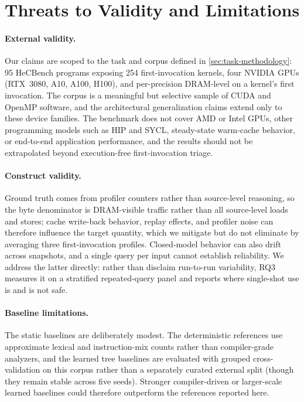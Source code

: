 \section{Threats to Validity and Limitations}
\label{sec:threats}

\paragraph{External validity.}
Our claims are scoped to the task and corpus defined in \autoref{sec:task-methodology}: 95 HeCBench programs exposing 254 first-invocation kernels, four NVIDIA GPUs (RTX~3080, A10, A100, H100), and per-precision DRAM-level \rai on a kernel's first invocation.
The corpus is a meaningful but selective sample of CUDA and OpenMP software, and the architectural generalization claims extend only to these device families.
The benchmark does not cover AMD or Intel GPUs, other programming models such as HIP and SYCL, steady-state warm-cache behavior, or end-to-end application performance, and the results should not be extrapolated beyond execution-free first-invocation triage.

\paragraph{Construct validity.}
Ground truth comes from profiler counters rather than source-level reasoning, so the byte denominator is DRAM-visible traffic rather than all source-level loads and stores; cache write-back behavior, replay effects, and profiler noise can therefore influence the target quantity, which we mitigate but do not eliminate by averaging three first-invocation profiles.
Closed-model behavior can also drift across snapshots, and a single query per input cannot establish reliability.
We address the latter directly: rather than disclaim run-to-run variability, RQ3 measures it on a stratified repeated-query panel and reports where single-shot use is and is not safe.

\paragraph{Baseline limitations.}
The static baselines are deliberately modest.
The deterministic references use approximate lexical and instruction-mix counts rather than compiler-grade analyzers, and the learned tree baselines are evaluated with grouped cross-validation on this corpus rather than a separately curated external split (though they remain stable across five seeds).
Stronger compiler-driven or larger-scale learned baselines could therefore outperform the references reported here.

